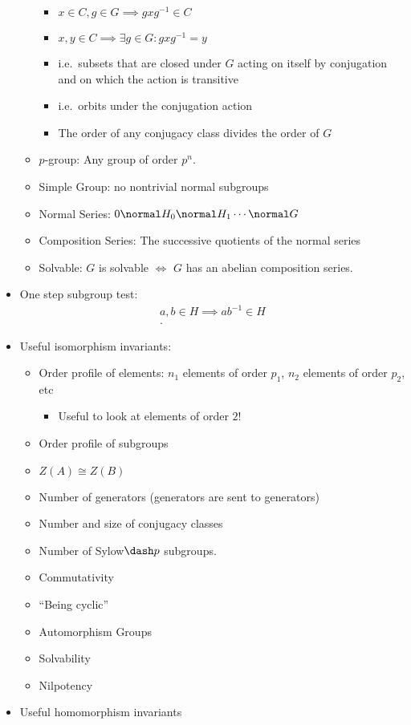 \begin{itemize}
\begin{itemize}
    \begin{itemize}
    \tightlist
    \item
      \(x\in C, g\in G \implies gxg^{-1} \in C\)
    \item
      \(x,y \in C \implies \exists g\in G : gxg^{-1} = y\)
    \item
      i.e.~subsets that are closed under \(G\) acting on itself by
      conjugation and on which the action is transitive
    \item
      i.e.~orbits under the conjugation action
    \item
      The order of any conjugacy class divides the order of \(G\)
    \end{itemize}
  \item
    \(p\)-group: Any group of order \(p^n\).
  \item
    Simple Group: no nontrivial normal subgroups
  \item
    Normal Series: \(0 \normal H_0 \normal H_1 \cdots \normal G\)
  \item
    Composition Series: The successive quotients of the normal series
  \item
    Solvable: \(G\) is solvable \(\iff\) \(G\) has an abelian
    composition series.
  \end{itemize}
\item
  One step subgroup test:
  \begin{align*}  
  a,b \in H \implies a b^{-1} \in H \\
  .\end{align*}
\item
  Useful isomorphism invariants:

  \begin{itemize}
  \tightlist
  \item
    Order profile of elements: \(n_1\) elements of order \(p_1\),
    \(n_2\) elements of order \(p_2\), etc

    \begin{itemize}
    \tightlist
    \item
      Useful to look at elements of order \(2\)!
    \end{itemize}
  \item
    Order profile of subgroups
  \item
    \(Z(A) \cong Z(B)\)
  \item
    Number of generators (generators are sent to generators)
  \item
    Number and size of conjugacy classes
  \item
    Number of Sylow\(\dash p\) subgroups.
  \item
    Commutativity
  \item
    ``Being cyclic''
  \item
    Automorphism Groups
  \item
    Solvability
  \item
    Nilpotency
  \end{itemize}
\item
  Useful homomorphism invariants


\end{itemize}
